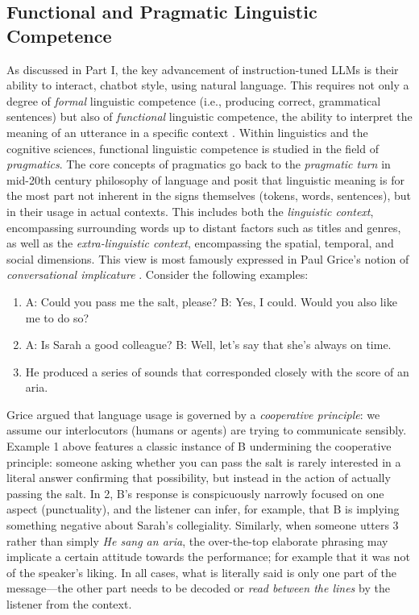 \subsection{Functional and Pragmatic Linguistic Competence}
As discussed in Part I, the key advancement of instruction-tuned LLMs is their ability to interact, chatbot style, using natural language. This requires not only a degree of \emph{formal} linguistic competence (i.e., producing correct, grammatical sentences) but also of \emph{functional} linguistic competence, the ability to interpret the meaning of an utterance in a specific context \citep{mahowald2023dissociating}. Within linguistics and the cognitive sciences, functional linguistic competence is studied in the field of {\em pragmatics}. The core concepts of pragmatics go back to the {\em pragmatic turn} in mid-20th century philosophy of language and posit that linguistic meaning is for the most part not inherent in the signs themselves (tokens, words, sentences), but in their usage in actual contexts. This includes both the \emph{linguistic context}, encompassing surrounding words up to distant factors such as titles and genres, as well as the \emph{extra-linguistic context}, encompassing the spatial, temporal, and social dimensions. This view is most famously expressed in Paul Grice's notion of \emph{conversational implicature} \citep{Grice_1975}. Consider the following examples:

\begin{enumerate}
    \item A: Could you pass me the salt, please? B: Yes, I could. Would you also like me to do so?
    \item A: Is Sarah a good colleague? B: Well, let's say that she's always on time.
    \item He produced a series of sounds that corresponded closely with the score of an aria.
\end{enumerate}
%
Grice argued that language usage is governed by a \emph{cooperative principle}: we assume our interlocutors (humans or agents) are trying to communicate sensibly. Example 1 above features a classic instance of B undermining the cooperative principle: someone asking whether you can pass the salt is rarely interested in a literal answer confirming that possibility, but instead in the action of actually passing the salt. In 2, B's response is conspicuously narrowly focused on one aspect (punctuality), and the listener can infer, for example, that B is implying something negative about Sarah's collegiality. Similarly, when someone utters 3 rather than simply {\em He sang an aria}, the over-the-top elaborate phrasing may implicate a certain attitude towards the performance; for example that it was not of the speaker's liking. In all cases, what is literally said is only one part of the message––the other part needs to be decoded or {\em read between the lines} by the listener from the context. 

